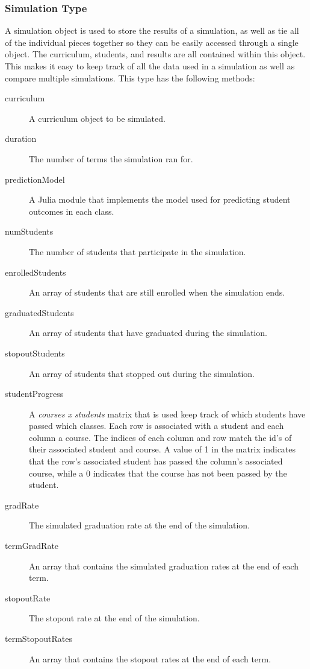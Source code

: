 \documentclass[botnum, fleqn]{unmeethesis}
\begin{document}
    


    \subsubsection{Simulation Type}
    A simulation object is used to store the results of a simulation, as well as tie all of the individual pieces together so they can be easily accessed through a single object. The curriculum, students, and results are all contained within this object. This makes it easy to keep track of all the data used in a simulation as well as compare multiple simulations. This type has the following methods:

    \begin{description}
      \item [curriculum] A curriculum object to be simulated.
      \item [duration] The number of terms the simulation ran for.
      \item [predictionModel] A Julia module that implements the model used for predicting student outcomes in each class.
      \item [numStudents] The number of students that participate in the simulation.
      \item [enrolledStudents] An array of students that are still enrolled when the simulation ends.
      \item [graduatedStudents] An array of students that have graduated during the simulation.
      \item [stopoutStudents] An array of students that stopped out during the simulation.
      \item [studentProgress] A \textit{courses x students} matrix that is used keep track of which students have passed which classes. Each row is associated with a student and each column a course. The indices of each column and row match the id's of their associated student and course. A value of 1 in the matrix indicates that the row's associated student has passed the column's associated course, while a 0 indicates that the course has not been passed by the student.
      \item [gradRate] The simulated graduation rate at the end of the simulation.
      \item [termGradRate] An array that contains the simulated graduation rates at the end of each term.
      \item [stopoutRate] The stopout rate at the end of the simulation.
      \item [termStopoutRates] An array that contains the stopout rates at the end of each term.
    \end{description}
\end{document}
